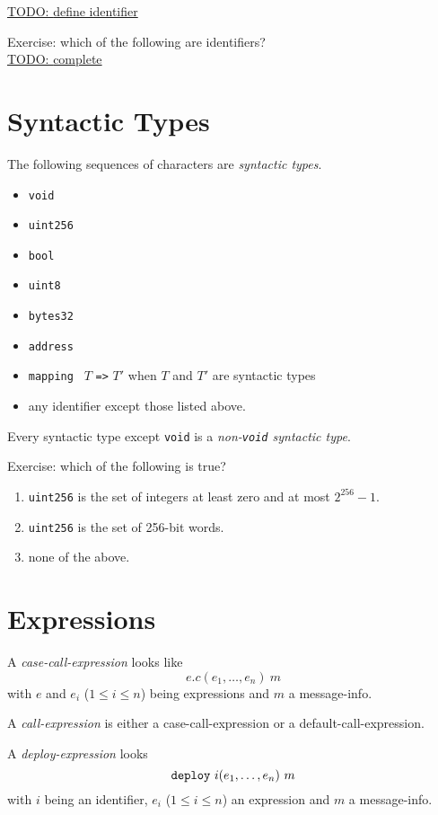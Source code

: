 \documentclass{book}
\newcommand{\todo}[1]{\underline{TODO: {#1}}}
\begin{document}
\todo{define identifier}


Exercise: which of the following are identifiers? \\
\todo{complete}

\section{Syntactic Types}

The following sequences of characters are \textit{syntactic types}.
\begin{itemize}
\item \texttt{void}
\item \texttt{uint256}
\item \texttt{bool}
\item \texttt{uint8}
\item \texttt{bytes32}
\item \texttt{address}
\item \texttt{mapping } $T$ \texttt{=>} $T'$ when $T$ and $T'$ are syntactic types
\item any identifier except those listed above.
\end{itemize}

Every syntactic type except \texttt{void} is a \textit{non-\texttt{void} syntactic type}.

Exercise: which of the following is true?
\begin{enumerate}
\item \texttt{uint256} is the set of integers at least zero and at most $2^{256} - 1$.
\item \texttt{uint256} is the set of 256-bit words.
\item none of the above.
\end{enumerate}

\section{Expressions}

A \textit{case-call-expression} looks like
\[
e . c (e_1, \ldots, e_n)\ m
\]
with $e$ and $e_i$ ($1 \le i \le n$) being expressions and $m$ a message-info.

A \textit{call-expression} is either a case-call-expression or a default-call-expression.

A \textit{deploy-expression} looks
\[
\text{\texttt{deploy}}\ i(e_1,\ldots,e_n)\ m
\]
with $i$ being an identifier, $e_i$ ($1 \le i \le n$) an expression and $m$ a message-info.
\end{document}
